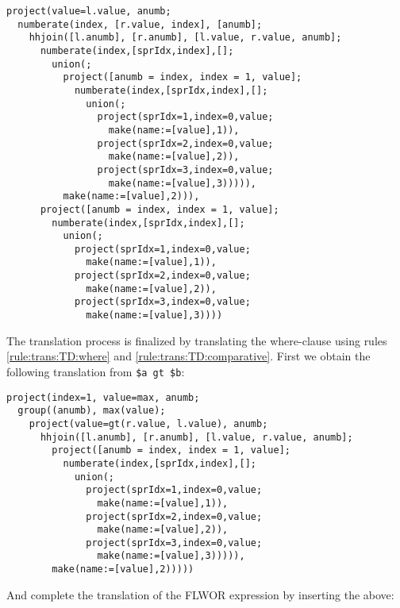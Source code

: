 \begin{Verbatim}
project(value=l.value, anumb;
  numberate(index, [r.value, index], [anumb];
    hhjoin([l.anumb], [r.anumb], [l.value, r.value, anumb];
      numberate(index,[sprIdx,index],[];
        union(;
          project([anumb = index, index = 1, value];
            numberate(index,[sprIdx,index],[];
              union(;
                project(sprIdx=1,index=0,value;
                  make(name:=[value],1)),
                project(sprIdx=2,index=0,value;
                  make(name:=[value],2)),
                project(sprIdx=3,index=0,value;
                  make(name:=[value],3))))),
          make(name:=[value],2))),
      project([anumb = index, index = 1, value];
        numberate(index,[sprIdx,index],[];
          union(;
            project(sprIdx=1,index=0,value;
              make(name:=[value],1)),
            project(sprIdx=2,index=0,value;
              make(name:=[value],2)),
            project(sprIdx=3,index=0,value;
              make(name:=[value],3))))
\end{Verbatim}

The translation process is finalized by translating the where-clause using rules
\ref{rule:trans:TD:where} and \ref{rule:trans:TD:comparative}. First we
obtain the following translation from \texttt{\$a gt \$b}:

\begin{Verbatim}
project(index=1, value=max, anumb;
  group((anumb), max(value);
    project(value=gt(r.value, l.value), anumb;
      hhjoin([l.anumb], [r.anumb], [l.value, r.value, anumb];
        project([anumb = index, index = 1, value];
          numberate(index,[sprIdx,index],[];
            union(;
              project(sprIdx=1,index=0,value;
                make(name:=[value],1)),
              project(sprIdx=2,index=0,value;
                make(name:=[value],2)),
              project(sprIdx=3,index=0,value;
                make(name:=[value],3))))),
        make(name:=[value],2)))))
\end{Verbatim}

And complete the translation of the FLWOR expression by inserting the above:

